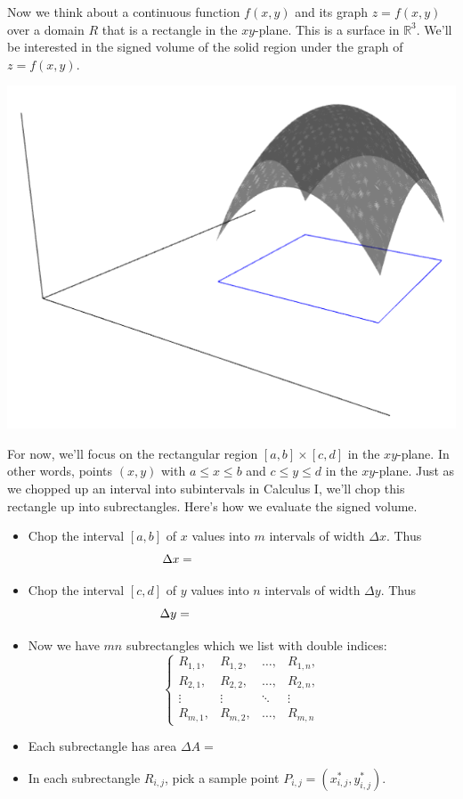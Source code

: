 Now we think about a continuous function $f(x,y)$ and its graph $z=f(x,y)$ over a domain $R$ that is a rectangle in the $xy$-plane. This is a surface in $\mathbb{R}^3$. We'll be interested in the signed volume of the solid region under the graph of $z=f(x,y)$.

\includegraphics[width=.4\textwidth]{images/mesh1.png}\label{img:sage-double-int-1}

\begin{minipage}{.55\textwidth}
    For now, we'll focus on the rectangular region $[a,b]\times[c,d]$ in the $xy$-plane. In other words, points $(x,y)$ with $a\le x\le b$ and $c\le y\le d$ in the $xy$-plane. Just as we chopped up an interval into subintervals in Calculus I, we'll chop this rectangle up into subrectangles. Here's how we evaluate the signed volume.
    
    \begin{itemize}
        \item Chop the interval $[a,b]$ of $x$ values into $m$ intervals of width $\Delta x$. Thus 
        \[\Delta x = \hspace{1.5in} \] 
        
        \item Chop the interval $[c,d]$ of $y$ values into $n$ intervals of width $\Delta y$. Thus
        \[
            \Delta y = \hspace{1.5in} 
            \]
        
        \item Now we have $mn$ subrectangles which we list with double indices: 
        \[
            \left\{
                \begin{array}{cccc}
                    R_{1,1}, & R_{1,2}, & \dots, & R_{1,n}, \\
                    R_{2,1}, & R_{2,2}, & \dots, & R_{2,n}, \\
                    \vdots & \vdots & \ddots & \vdots \\
                    R_{m,1}, & R_{m,2}, & \dots, & R_{m,n}
                \end{array}
            \right.
        \]
        
        \item Each subrectangle has area $\Delta A = $%
        \item In each subrectangle $R_{i,j}$, pick a sample point $P_{i,j}=(x_{i,j}^*,y_{i,j}^*)$.
    \end{itemize}
\end{minipage}

